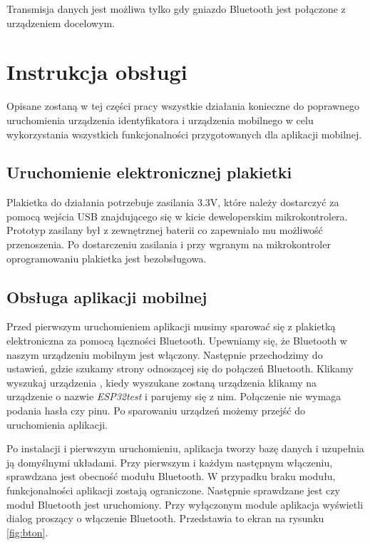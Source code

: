 \documentclass[a4paper,12pt, twoside]{article}
\begin{document}
    	Transmisja danych jest możliwa tylko gdy gniazdo Bluetooth jest połączone z urządzeniem docelowym.
    	
    	\vspace{.5cm}
    	\section{Instrukcja obsługi}
    	Opisane zostaną w tej części pracy wszystkie działania konieczne do poprawnego uruchomienia urządzenia identyfikatora i urządzenia mobilnego w celu wykorzystania wszystkich funkcjonalności przygotowanych dla aplikacji mobilnej.
    	
    	\vspace{.5cm}
    	\subsection{Uruchomienie elektronicznej plakietki}
    	Plakietka do działania potrzebuje zasilania 3.3V, które należy dostarczyć za pomocą wejścia USB znajdującego się w kicie deweloperskim mikrokontrolera. Prototyp zasilany był z zewnętrznej baterii co zapewniało mu możliwość przenoszenia. Po dostarczeniu zasilania i przy wgranym na mikrokontroler oprogramowaniu plakietka jest bezobsługowa.
    	
    	\vspace{.5cm}
    	\subsection{Obsługa aplikacji mobilnej}
    	Przed pierwszym uruchomieniem aplikacji musimy sparować się z plakietką elektroniczna za pomocą łączności Bluetooth. Upewniamy się, że Bluetooth w naszym urządzeniu mobilnym jest włączony. Następnie przechodzimy do ustawień, gdzie szukamy strony odnoszącej się do połączeń Bluetooth. Klikamy wyszukaj urządzenia , kiedy wyszukane zostaną urządzenia klikamy na urządzenie o nazwie \textit{ESP32test} i parujemy się z nim. Połączenie nie wymaga podania hasła czy pinu. Po sparowaniu urządzeń możemy przejść do uruchomienia aplikacji. 
    	
    	Po instalacji i pierwszym uruchomieniu, aplikacja tworzy bazę danych i uzupełnia ją domyślnymi układami. 
    	Przy pierwszym i każdym następnym włączeniu, sprawdzana jest obecność modułu Bluetooth. W przypadku braku modułu, funkcjonalności aplikacji zostają ograniczone. Następnie sprawdzane jest czy moduł Bluetooth jest uruchomiony. Przy wyłączonym module aplikacja wyświetli dialog proszący o włączenie Bluetooth. Przedstawia to ekran na rysunku \ref{fig:bton}.
    	
\end{document}
